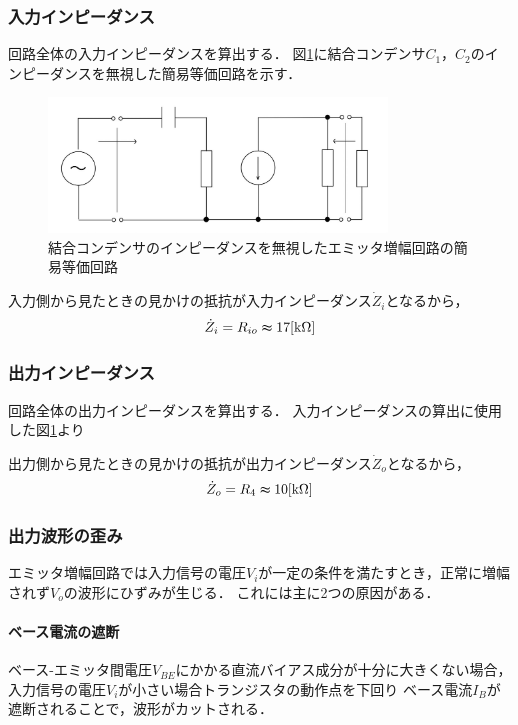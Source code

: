 \documentclass[dvipdfmx,titlepage,a4j]{jsarticle}  %
\numberwithin{equation}{section}
\begin{document}
\subsubsection{入力インピーダンス}
回路全体の入力インピーダンスを算出する．
図\ref{fig:fig5-im.jpg}に結合コンデンサ$C_1$，$C_2$のインピーダンスを無視した簡易等価回路を示す．
\begin{figure}[H]
  \centering
  \includegraphics[width=9cm]{../fig/fig5-im.jpg}
  \caption{結合コンデンサのインピーダンスを無視したエミッタ増幅回路の簡易等価回路}
  \label{fig:fig5-im.jpg}
\end{figure}

入力側から見たときの見かけの抵抗が入力インピーダンス$\dot{Z}_i$となるから，
\begin{equation}
  \dot{Z}_i = R_{io} \thickapprox 17 \mathrm{[k \Omega]}
\end{equation}

\subsubsection{出力インピーダンス}
回路全体の出力インピーダンスを算出する．
入力インピーダンスの算出に使用した図\ref{fig:fig5-im.jpg}より

出力側から見たときの見かけの抵抗が出力インピーダンス$\dot{Z}_o$となるから，
\begin{equation}
  \dot{Z}_o = R_4 \thickapprox 10 \mathrm{[k \Omega]}
\end{equation}

\subsubsection{出力波形の歪み}
エミッタ増幅回路では入力信号の電圧$V_i$が一定の条件を満たすとき，正常に増幅されず$V_o$の波形にひずみが生じる．
これには主に2つの原因がある．

\paragraph{ベース電流の遮断}
ベース-エミッタ間電圧$V_{BE}$にかかる直流バイアス成分が十分に大きくない場合，入力信号の電圧$V_i$が小さい場合トランジスタの動作点を下回り
ベース電流$I_B$が遮断されることで，波形がカットされる．
\end{document}
